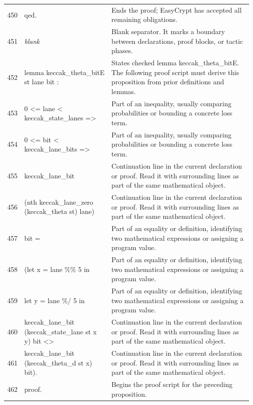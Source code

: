 \documentclass[10pt]{article}
\begin{document}
\begin{longtable}{r L{0.53\textwidth} L{0.37\textwidth}}
450 & {\ttfamily\scriptsize qed.} & Ends the proof; EasyCrypt has accepted all remaining obligations. \\
451 & {\ttfamily\scriptsize \emph{blank}} & Blank separator.  It marks a boundary between declarations, proof blocks, or tactic phases. \\
452 & {\ttfamily\scriptsize lemma keccak\_theta\_bitE st lane bit :} & States checked lemma keccak\_theta\_bitE.  The following proof script must derive this proposition from prior definitions and lemmas. \\
453 & {\ttfamily\scriptsize   0 <= lane < keccak\_state\_lanes =>} & Part of an inequality, usually comparing probabilities or bounding a concrete loss term. \\
454 & {\ttfamily\scriptsize   0 <= bit < keccak\_lane\_bits =>} & Part of an inequality, usually comparing probabilities or bounding a concrete loss term. \\
455 & {\ttfamily\scriptsize   keccak\_lane\_bit} & Continuation line in the current declaration or proof.  Read it with surrounding lines as part of the same mathematical object. \\
456 & {\ttfamily\scriptsize     (nth keccak\_lane\_zero (keccak\_theta st) lane)} & Continuation line in the current declaration or proof.  Read it with surrounding lines as part of the same mathematical object. \\
457 & {\ttfamily\scriptsize     bit =} & Part of an equality or definition, identifying two mathematical expressions or assigning a program value. \\
458 & {\ttfamily\scriptsize   (let x = lane \%\% 5 in} & Part of an equality or definition, identifying two mathematical expressions or assigning a program value. \\
459 & {\ttfamily\scriptsize    let y = lane \%/ 5 in} & Part of an equality or definition, identifying two mathematical expressions or assigning a program value. \\
460 & {\ttfamily\scriptsize    keccak\_lane\_bit (keccak\_state\_lane st x y) bit <>} & Continuation line in the current declaration or proof.  Read it with surrounding lines as part of the same mathematical object. \\
461 & {\ttfamily\scriptsize    keccak\_lane\_bit (keccak\_theta\_d st x) bit).} & Continuation line in the current declaration or proof.  Read it with surrounding lines as part of the same mathematical object. \\
462 & {\ttfamily\scriptsize proof.} & Begins the proof script for the preceding proposition. \\

\end{longtable}
\end{document}
